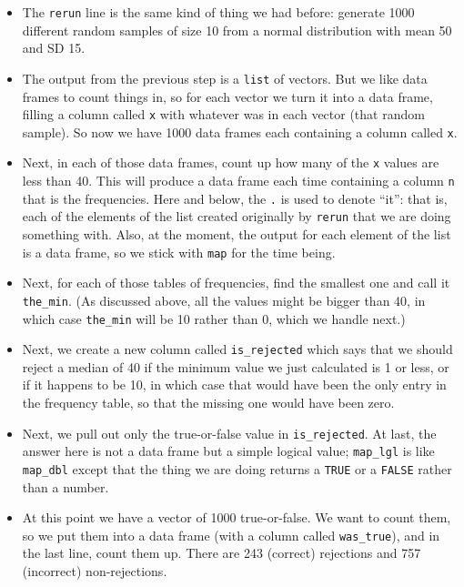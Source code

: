 \documentclass[]{tufte-book}
\theoremstyle{definition}
\theoremstyle{definition}
\theoremstyle{definition}
\theoremstyle{remark}
\begin{document}
\begin{itemize}
\item
  The \texttt{rerun} line is the same kind of thing we had before:
  generate 1000 different random samples of size 10 from a normal
  distribution with mean 50 and SD 15.
\item
  The output from the previous step is a \texttt{list} of vectors. But
  we like data frames to count things in, so for each vector we turn it
  into a data frame, filling a column called \texttt{x} with whatever
  was in each vector (that random sample). So now we have 1000 data
  frames each containing a column called \texttt{x}.
\item
  Next, in each of those data frames, count up how many of the
  \texttt{x} values are less than 40. This will produce a data frame
  each time containing a column \texttt{n} that is the frequencies. Here
  and below, the \texttt{.} is used to denote ``it'': that is, each of
  the elements of the list created originally by \texttt{rerun} that we
  are doing something with. Also, at the moment, the output for each
  element of the list is a data frame, so we stick with \texttt{map} for
  the time being.
\item
  Next, for each of those tables of frequencies, find the smallest one
  and call it \texttt{the\_min}. (As discussed above, all the values
  might be bigger than 40, in which case \texttt{the\_min} will be 10
  rather than 0, which we handle next.)
\item
  Next, we create a new column called \texttt{is\_rejected} which says
  that we should reject a median of 40 if the minimum value we just
  calculated is 1 or less, or if it happens to be 10, in which case that
  would have been the only entry in the frequency table, so that the
  missing one would have been zero.
\item
  Next, we pull out only the true-or-false value in
  \texttt{is\_rejected}. At last, the answer here is not a data frame
  but a simple logical value; \texttt{map\_lgl} is like
  \texttt{map\_dbl} except that the thing we are doing returns a
  \texttt{TRUE} or a \texttt{FALSE} rather than a number.
\item
  At this point we have a vector of 1000 true-or-false. We want to count
  them, so we put them into a data frame (with a column called
  \texttt{was\_true}), and in the last line, count them up. There are
  243 (correct) rejections and 757 (incorrect) non-rejections.
\end{itemize}
\end{document}
